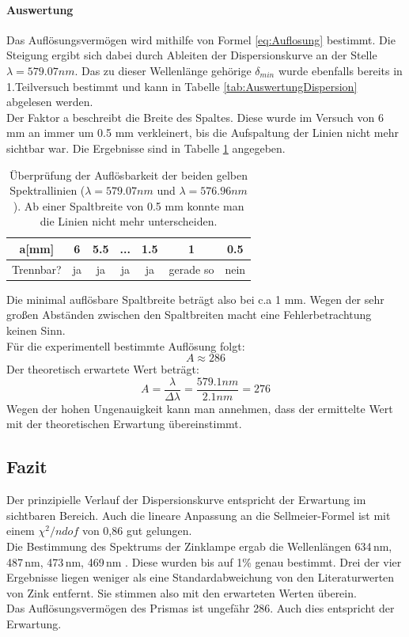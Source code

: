 \documentclass[12pt,a4paper]{article}
\begin{document}
\paragraph{Auswertung}
Das Auflösungsvermögen wird mithilfe von Formel \ref{eq:Auflosung} bestimmt.
Die Steigung ergibt sich dabei durch Ableiten der Dispersionskurve an der Stelle $\lambda = 579.07 nm$. Das zu dieser Wellenlänge gehörige $\delta_{min}$ wurde ebenfalls bereits in 1.Teilversuch bestimmt und kann in Tabelle \ref{tab:AuswertungDispersion} abgelesen werden. \\
Der Faktor a beschreibt die Breite des Spaltes. Diese wurde im Versuch von 6 mm an immer um 0.5 mm verkleinert, bis die Aufspaltung der Linien nicht mehr sichtbar war. Die Ergebnisse sind in Tabelle \ref{tab:Auflosung_Prisma} angegeben.
\begin{table}
\centering
\begin{tabular}{|c|c|c|c|c|c|c|}
\hline
a[mm] & 6 & 5.5 & ... & 1.5 & 1 & 0.5\\
\hline
Trennbar? & ja & ja & ja & ja & gerade so & nein\\
\hline
\end{tabular}
\caption{Überprüfung der Auflösbarkeit der beiden gelben Spektrallinien ($\lambda = 579.07nm$ und $\lambda = 576.96nm$). Ab einer Spaltbreite von 0.5 mm konnte man die Linien nicht mehr unterscheiden.}
\label{tab:Auflosung_Prisma}
\end{table}
Die minimal auflösbare Spaltbreite beträgt also bei c.a 1 mm.
Wegen der sehr großen Abständen zwischen den Spaltbreiten macht eine Fehlerbetrachtung keinen Sinn.\\
Für die experimentell bestimmte Auflösung folgt:
\begin{equation}
A \approx 286
\end{equation}
Der theoretisch erwartete Wert beträgt:
\begin{equation}
A = \dfrac{\lambda}{\Delta \lambda} = \dfrac{579.1 nm}{2.1 nm} = 276
\end{equation}
Wegen der hohen Ungenauigkeit kann man annehmen, dass der ermittelte Wert mit der theoretischen Erwartung übereinstimmt.
	
	
\subsection{Fazit}
Der prinzipielle Verlauf der Dispersionskurve entspricht der Erwartung im sichtbaren Bereich. Auch die lineare Anpassung an die Sellmeier-Formel ist mit einem $\chi^2/ndof$ von 0,86 gut gelungen.\\
Die Bestimmung des Spektrums der Zinklampe ergab die Wellenlängen 634\,nm, 487\,nm, 473\,nm, 469\,nm . Diese wurden bis auf 1\% genau bestimmt. Drei der vier Ergebnisse liegen weniger als eine Standardabweichung von den Literaturwerten von Zink entfernt. Sie stimmen also mit den erwarteten Werten überein.\\
Das Auflösungsvermögen des Prismas ist ungefähr 286. Auch dies entspricht der Erwartung.
	
\end{document}
